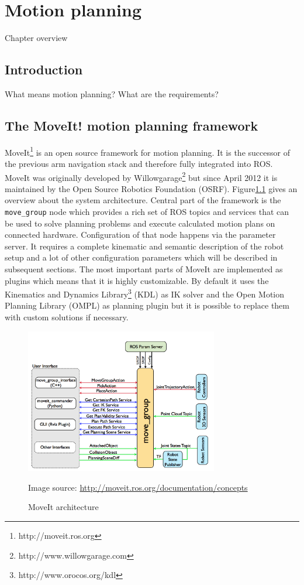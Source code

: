 
\chapter{Motion planning}
Chapter overview

\section{Introduction}
What means motion planning?
What are the requirements?


\section{The MoveIt! motion planning framework}

MoveIt\footnote{http://moveit.ros.org} is an open source framework for motion planning. It is the successor of the previous arm navigation stack and therefore fully integrated into ROS. MoveIt was originally developed by Willowgarage\footnote{http://www.willowgarage.com} but since April 2012 it is maintained by the Open Source Robotics Foundation (OSRF). Figure\ref{fig:moveit_arch} gives an overview about the system architecture. Central part of the framework is the \texttt{move\_group} node which  provides a rich set of ROS topics and services that can be used to solve planning problems and execute calculated motion plans on connected hardware. Configuration of that node happens via the parameter server. It requires a complete kinematic and semantic description of the robot setup and a lot of other configuration parameters which will be described in subsequent sections. The most important parts of MoveIt are implemented as plugins which means that it is highly customizable. By default it uses the Kinematics and Dynamics Library\footnote{http://www.orocos.org/kdl} (KDL) as IK solver and the Open Motion Planning Library (OMPL) as planning plugin but it is possible to replace them with custom solutions if necessary.\\

\begin{figure}[ht]
	\centering
  	\includegraphics[width=0.75\textwidth]{images/moveit_architecture.jpg}
	\caption[Moveit architecture]{MoveIt architecture}
	{\scriptsize Image source: \url{http://moveit.ros.org/documentation/concepts}}
	\label{fig:moveit_arch}
\end{figure}


